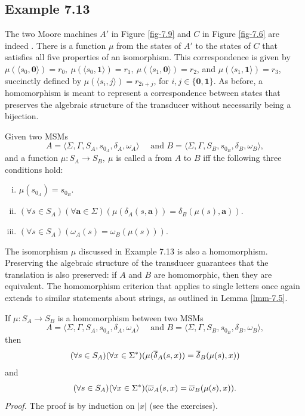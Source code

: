 \subsection*{Example 7.13}

The two Moore machines $A'$ in Figure \ref{fig-7.9} and $C$ in Figure \ref{fig-7.6} are indeed
. There is a function $\mu$ from the states of $A'$ to the states of
$C$ that satisfies all five properties of an isomorphism. This correspondence is
given by $\mu(\langle s_0,\pmb{0}\rangle) = r_0,\ \mu(\langle s_0,\pmb{1}\rangle)
=r_1,\ \mu(\langle s_1,\pmb{0}\rangle)=r_2$, and $\mu(\langle s_1,\pmb{1}\rangle)=r_3$,
succinctly defined by $\mu(\langle s_i,j\rangle)=r_{2i+j}$, for $i,j \in
\{\pmb{0},\pmb{1}\}$. As before, a homomorphism is meant to represent a
correspondence between states that preserves the algebraic structure of the
transducer without necessarily being a bijection.

\begin{dfn}\label{dfn-7.22}
Given two MSMs
\[ A=\langle\Sigma,\Gamma,S_A,s_{0_A},\delta_A,\omega_A\rangle\quad\text{ and }
	B=\langle\Sigma,\Gamma,S_B,s_{0_B},\delta_B,\omega_B\rangle, \]
and a function $\mu$$: S_A \rightarrow S_B,\ \mu$ is called a \emph{} from $A$ to $B$ iff the following three conditions hold:

\begin{enumerate}[i.]
\item $\mu(s_{0_A}) = s_{0_B}$.
\item $(\forall s \in S_A)(\forall\pmb{a}\in\Sigma)(\mu(\delta_A(s,\pmb{a})) =
	\delta_B(\mu(s),\pmb{a}))$.
\item $(\forall s \in S_A)(\omega_A(s) = \omega_B(\mu(s)))$.
\end{enumerate}
\end{dfn}

The isomorphism $\mu$ discussed in Example 7.13 is also a homomorphism.
Preserving the algebraic structure of the transducer guarantees that the
translation is also preserved: if $A$ and $B$ are homomorphic, then they are
equivalent. The homomorphism criterion that applies to single letters once again
extends to similar statements about strings, as outlined in Lemma \ref{lmm-7.5}.

\begin{lmm}\label{lmm-7.5}
If $\mu$$: S_A \rightarrow S_B$ is a homomorphism between two MSMs
\[ A=\langle\Sigma,\Gamma,S_A,s_{0_A},\delta_A,\omega_A\rangle\quad\text{ and }
	B=\langle\Sigma,\Gamma,S_B,s_{0_B},\delta_B,\omega_B\rangle, \]
then
\[ (\forall s \in S_A)(\forall x \in \Sigma^*)(\mu(\overline{\delta}_A(s,x))=\overline{\delta}_B
	(\mu(s),x)) \]
and
\[ (\forall s \in S_A)(\forall x \in \Sigma^*)(\overline{\omega}_A(s,x)=\overline{\omega}_B
	(\mu(s),x)). \]
\emph{Proof.} The proof is by induction on $|x|$ (see the exercises).
\end{lmm}

